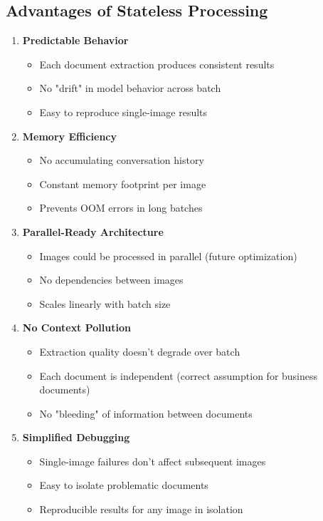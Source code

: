 \documentclass[11pt,a4paper]{article}
\begin{document}
\subsection{Advantages of Stateless Processing}

\begin{enumerate}[leftmargin=*]
    \item \textbf{Predictable Behavior}
    \begin{itemize}
        \item Each document extraction produces consistent results
        \item No "drift" in model behavior across batch
        \item Easy to reproduce single-image results
    \end{itemize}

    \item \textbf{Memory Efficiency}
    \begin{itemize}
        \item No accumulating conversation history
        \item Constant memory footprint per image
        \item Prevents OOM errors in long batches
    \end{itemize}

    \item \textbf{Parallel-Ready Architecture}
    \begin{itemize}
        \item Images could be processed in parallel (future optimization)
        \item No dependencies between images
        \item Scales linearly with batch size
    \end{itemize}

    \item \textbf{No Context Pollution}
    \begin{itemize}
        \item Extraction quality doesn't degrade over batch
        \item Each document is independent (correct assumption for business documents)
        \item No "bleeding" of information between documents
    \end{itemize}

    \item \textbf{Simplified Debugging}
    \begin{itemize}
        \item Single-image failures don't affect subsequent images
        \item Easy to isolate problematic documents
        \item Reproducible results for any image in isolation
    \end{itemize}
\end{enumerate}
\end{document}
